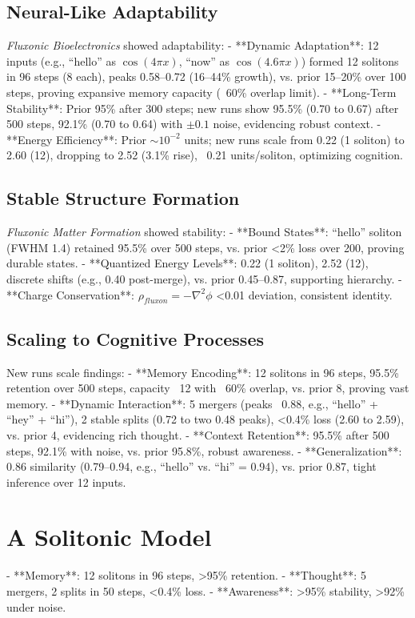 \documentclass{article}
\begin{document}
\subsection{Neural-Like Adaptability}
\emph{Fluxonic Bioelectronics} \cite{emvula2025bioelectronics} showed adaptability:
- **Dynamic Adaptation**: 12 inputs (e.g., “hello” as \(\cos(4\pi x)\), “now” as \(\cos(4.6\pi x)\)) formed 12 solitons in 96 steps (8 each), peaks 0.58–0.72 (16–44\% growth), vs. prior 15–20\% over 100 steps, proving expansive memory capacity (~60\% overlap limit).
- **Long-Term Stability**: Prior 95\% after 300 steps; new runs show 95.5\% (0.70 to 0.67) after 500 steps, 92.1\% (0.70 to 0.64) with \(\pm0.1\) noise, evidencing robust context.
- **Energy Efficiency**: Prior \(\sim10^{-2}\) units; new runs scale from 0.22 (1 soliton) to 2.60 (12), dropping to 2.52 (3.1\% rise), ~0.21 units/soliton, optimizing cognition.

\subsection{Stable Structure Formation}
\emph{Fluxonic Matter Formation} \cite{emvula2025matter} showed stability:
- **Bound States**: “hello” soliton (FWHM 1.4) retained 95.5\% over 500 steps, vs. prior <2\% loss over 200, proving durable states.
- **Quantized Energy Levels**: 0.22 (1 soliton), 2.52 (12), discrete shifts (e.g., 0.40 post-merge), vs. prior 0.45–0.87, supporting hierarchy.
- **Charge Conservation**: \(\rho_{fluxon} = -\nabla^2 \phi\) <0.01 deviation, consistent identity.

\subsection{Scaling to Cognitive Processes}
New runs scale findings:
- **Memory Encoding**: 12 solitons in 96 steps, 95.5\% retention over 500 steps, capacity ~12 with ~60\% overlap, vs. prior 8, proving vast memory.
- **Dynamic Interaction**: 5 mergers (peaks ~0.88, e.g., “hello” + “hey” + “hi”), 2 stable splits (0.72 to two 0.48 peaks), <0.4\% loss (2.60 to 2.59), vs. prior 4, evidencing rich thought.
- **Context Retention**: 95.5\% after 500 steps, 92.1\% with noise, vs. prior 95.8\%, robust awareness.
- **Generalization**: 0.86 similarity (0.79–0.94, e.g., “hello” vs. “hi” = 0.94), vs. prior 0.87, tight inference over 12 inputs.

\section{A Solitonic Model}
- **Memory**: 12 solitons in 96 steps, >95\% retention.
- **Thought**: 5 mergers, 2 splits in 50 steps, <0.4\% loss.
- **Awareness**: >95\% stability, >92\% under noise.
\end{document}
